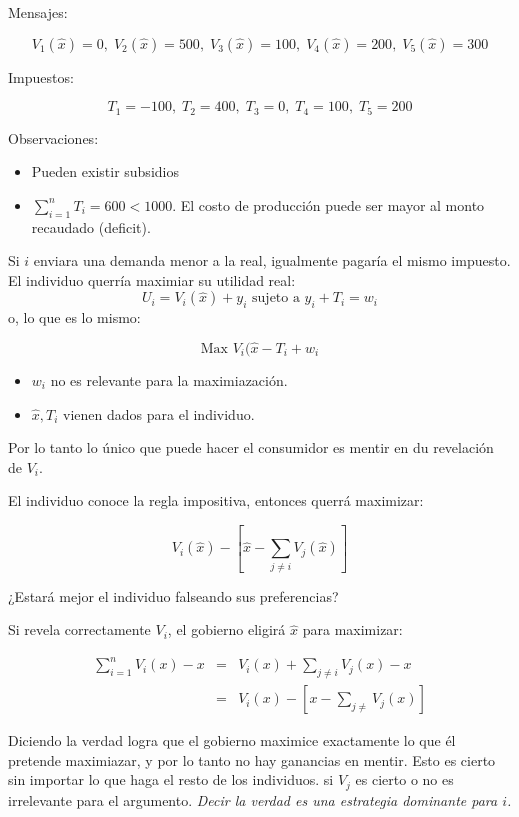 \begin{enumerate}
Mensajes:

$$ V_1(\hat{x})=0, \; V_2(\hat{x})=500, \;V_3(\hat{x})=100, \;V_4(\hat{x})=200, \;V_5(\hat{x})=300 $$

Impuestos:

$$ T_1 =-100, \; T_2 =400, \; T_3 =0, \; T_4 =100, \; T_5 =200 $$

Observaciones:

\begin{itemize}
 \item Pueden existir subsidios
 \item $\sum_{i=1}^{n}T_i=600 < 1000$. El costo de producción puede ser mayor al monto recaudado (deficit).
\end{itemize}

Si $i$ enviara una demanda menor a la real, igualmente pagaría el mismo impuesto.
El individuo querría maximiar su utilidad real:
$$U_i=V_i(\hat{x})+y_i \mbox{ sujeto a } y_i+T_i=w_i$$
o, lo que es lo mismo:

$$ \mbox{Max }V_i(\hat{x}-T_i+w_i$$

\begin{itemize}
 \item $w_i$ no es relevante para la maximiazación.
 \item $\hat{x}, T_i$ vienen dados para el individuo.
\end{itemize}
Por lo tanto  lo único que puede hacer el consumidor es mentir en du revelación de $V_i$.

El individuo conoce la regla impositiva, entonces querrá maximizar:

$$V_i(\hat{x})-\left[ \hat{x} - \sum_{j \neq i} V_j (\hat{x}) \right] $$

¿Estará mejor el individuo falseando sus preferencias?

Si revela correctamente $V_i$, el gobierno eligirá $\hat{x}$ para maximizar:

\begin{eqnarray}
\sum_{i=1}^{n} V_i(x)-x &=& V_i(x)+\sum_{j \neq i} V_j(x) - x \\
&=& V_i(x) - \left[ x- \sum_{j \neq} V_j (x)  \right]
\end{eqnarray} 

Diciendo la verdad logra que el gobierno maximice exactamente lo que él pretende maximiazar, y por lo tanto no hay ganancias en mentir. Esto es cierto sin importar lo que haga el resto de los individuos. si $V_j$ es cierto o no es irrelevante para el argumento. \emph{Decir la verdad es una estrategia dominante para $i$.}


\end{enumerate}
